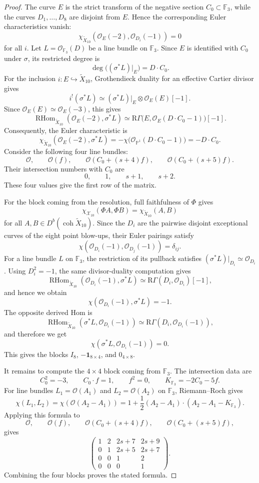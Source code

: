\documentclass[11pt]{article}
\theoremstyle{plain}
\theoremstyle{definition}
\theoremstyle{remark}
\newcommand{\Pp}{\mathbb P}
\newcommand{\F}{\mathbb F}
\newcommand{\coh}{\operatorname{coh}}
\newcommand{\RHom}{\operatorname{RHom}}
\newcommand{\OO}{\mathcal O}
\begin{document}
\begin{proof}
The curve \(E\) is the strict transform of the negative section \(C_0\subset\F_3\), while the curves \(D_1,\dots,D_8\) are disjoint from \(E\). Hence the corresponding Euler characteristics vanish:
\[
\chi_{\widetilde X_{10}}(\OO_E(-2),\OO_{D_i}(-1))=0
\]
for all \(i\). Let \(L=\OO_{\F_3}(D)\) be a line bundle on \(\F_3\). Since \(E\) is identified with \(C_0\) under \(\sigma\), its restricted degree is
\[
\deg\big((\sigma^*L)|_E\big)=D\cdot C_0.
\]
For the inclusion \(i:E\hookrightarrow\widetilde X_{10}\), Grothendieck duality for an effective Cartier divisor gives
\[
i^!(\sigma^*L)\simeq(\sigma^*L)|_E\otimes\OO_E(E)[-1].
\]
Since \(\OO_E(E)\simeq\OO_E(-3)\), this gives
\[
\RHom_{\widetilde X_{10}}(\OO_E(-2),\sigma^*L)
\simeq
\mathrm R\Gamma\bigl(E,\OO_E(D\cdot C_0-1)\bigr)[-1].
\]
Consequently, the Euler characteristic is
\[
\chi_{\widetilde X_{10}}(\OO_E(-2),\sigma^*L)
=
-\chi\bigl(\OO_{\Pp^1}(D\cdot C_0-1)\bigr)
=
-D\cdot C_0.
\]
Consider the following four line bundles:
\[
\OO,\qquad \OO(f),\qquad \OO(C_0+(s+4)f),\qquad \OO(C_0+(s+5)f).
\]
Their intersection numbers with \(C_0\) are
\[
0,\qquad 1,\qquad s+1,\qquad s+2.
\]
These four values give the first row of the matrix.

For the block coming from the resolution, full faithfulness of \(\Phi\) gives
\[
\chi_{\mathcal X_{10}}(\Phi A,\Phi B)
=
\chi_{\widetilde X_{10}}(A,B)
\]
for all \(A,B\in D^b(\coh\widetilde X_{10})\). Since the \(D_i\) are the pairwise disjoint exceptional curves of the eight point blow-ups, their Euler pairings satisfy
\[
\chi(\OO_{D_i}(-1),\OO_{D_j}(-1))=\delta_{ij}.
\]
For a line bundle \(L\) on \(\F_3\), the restriction of its pullback satisfies \((\sigma^*L)|_{D_i}\simeq\OO_{D_i}\). Using \(D_i^2=-1\), the same divisor-duality computation gives
\[
\RHom_{\widetilde X_{10}}(\OO_{D_i}(-1),\sigma^*L)
\simeq
\mathrm R\Gamma(D_i,\OO_{D_i})[-1],
\]
and hence we obtain
\[
\chi(\OO_{D_i}(-1),\sigma^*L)=-1.
\]
The opposite derived Hom is
\[
\RHom_{\widetilde X_{10}}(\sigma^*L,\OO_{D_i}(-1))
\simeq
\mathrm R\Gamma(D_i,\OO_{D_i}(-1)),
\]
and therefore we get
\[
\chi(\sigma^*L,\OO_{D_i}(-1))=0.
\]
This gives the blocks \(I_8\), \(-\mathbf 1_{8\times4}\), and \(0_{4\times8}\).

It remains to compute the \(4\times4\) block coming from \(\F_3\). The intersection data are
\[
C_0^2=-3,\qquad C_0\cdot f=1,\qquad f^2=0,\qquad K_{\F_3}=-2C_0-5f.
\]
For line bundles \(L_1=\OO(A_1)\) and \(L_2=\OO(A_2)\) on \(\F_3\), Riemann--Roch gives
\[
\chi(L_1,L_2)
=
\chi(\OO(A_2-A_1))
=
1+\frac12(A_2-A_1)\cdot(A_2-A_1-K_{\F_3}).
\]
Applying this formula to
\[
\OO,\qquad
\OO(f),\qquad
\OO(C_0+(s+4)f),\qquad
\OO(C_0+(s+5)f),
\]
gives
\[
\begin{pmatrix}
1&2&2s+7&2s+9\\
0&1&2s+5&2s+7\\
0&0&1&2\\
0&0&0&1
\end{pmatrix}.
\]
Combining the four blocks proves the stated formula.
\end{proof}
\end{document}
